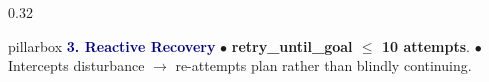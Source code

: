 \documentclass[10pt]{beamer}
\begin{document}
\begin{frame}[t]
\begin{columns}[T]
    \begin{column}{0.32\textwidth}
        \begin{beamercolorbox}[sep=3.5pt,rounded=true,shadow=true,wd=\linewidth]{pillarbox}
            \scriptsize \textbf{\textcolor{darkblue}{3. Reactive Recovery}}
            \vspace{0.05cm}\newline
            \tiny
            $\bullet$ \textbf{retry\_until\_goal $\le$ 10 attempts}.
            \newline
            $\bullet$ Intercepts disturbance $\to$ re-attempts plan rather than blindly continuing.
        \end{beamercolorbox}
    \end{column}
\end{columns}
\end{frame}
\end{document}
